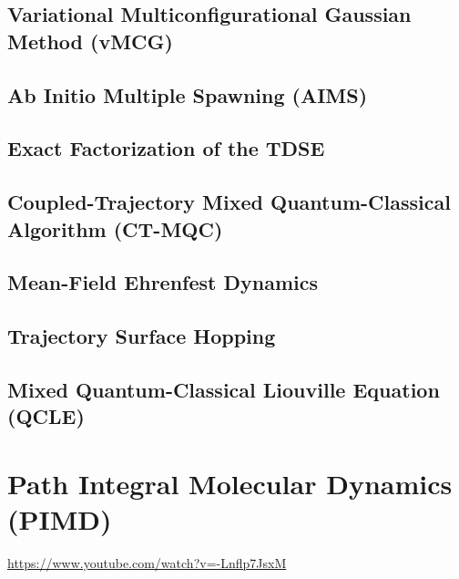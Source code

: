 \documentclass[9pt]{report}
\begin{document}
\subsection{Variational Multiconfigurational Gaussian Method (vMCG)}

\subsection{Ab Initio Multiple Spawning (AIMS)}

\subsection{Exact Factorization of the TDSE}

\subsection{Coupled-Trajectory Mixed Quantum-Classical Algorithm (CT-MQC)}

\subsection{Mean-Field Ehrenfest Dynamics}

\subsection{Trajectory Surface Hopping}

\subsection{Mixed Quantum-Classical Liouville Equation (QCLE)}












\newpage
\section{Path Integral Molecular Dynamics (PIMD)}
\url{https://www.youtube.com/watch?v=-Lnflp7JsxM}
\end{document}
